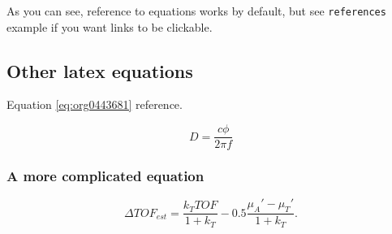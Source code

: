As you can see, reference to equations works by default, but see \texttt{references}
example if you want links to be clickable.

\subsection{Other latex equations}
\label{sec:orgfec5e1b}
Equation \ref{eq:org0443681} reference.

\begin{equation}
\label{eq:org0443681}
D = \frac{c\phi}{2\pi f}
\end{equation}

\subsubsection{A more complicated equation}
\label{sec:org6ffebbf}

\begin{equation}
\Delta TOF_{est} = \frac{k_T TOF}{1+k_T } - 0.5 \frac{\mu_A' - \mu_T'}{1+k_T}.
\end{equation}


